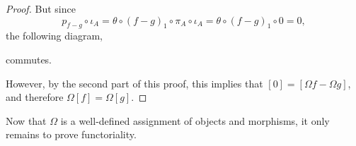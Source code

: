 \begin{proof}
    But since
    \[
        p_{f - g} \circ \iota_A = \theta \circ (f-g)_1 \circ \pi_A \circ \iota_A = \theta \circ (f-g)_1 \circ 0 = 0,
    \]
    the following diagram,
    \begin{center}
    \end{center}
    commutes.

    However, by the second part of this proof, this implies that \( [0] = [\Omega f - \Omega g] \), and therefore \( \Omega [f] = \Omega [g] \).
\end{proof}

Now that \( \Omega \) is a well-defined assignment of objects and morphisms, it only remains to prove functoriality.

